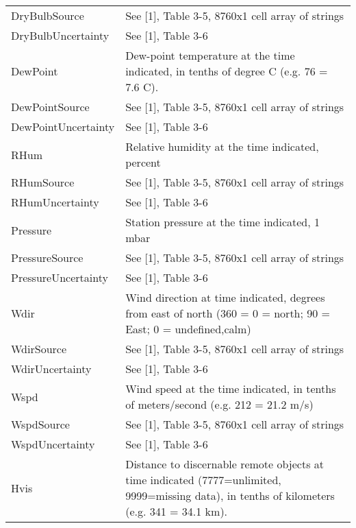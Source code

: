 \documentclass[letterpaper,10pt,english]{sphinxmanual}
\begin{document}
\begin{fulllineitems}
\begin{longtable}{|l|p{11cm}|}
DryBulbSource
 & 
See {[}1{]}, Table 3-5, 8760x1 cell array of strings
\\

DryBulbUncertainty
 & 
See {[}1{]}, Table 3-6
\\

DewPoint
 & 
Dew-point temperature at the time indicated, in tenths of degree C (e.g. 76 = 7.6 C).
\\

DewPointSource
 & 
See {[}1{]}, Table 3-5, 8760x1 cell array of strings
\\

DewPointUncertainty
 & 
See {[}1{]}, Table 3-6
\\

RHum
 & 
Relative humidity at the time indicated, percent
\\

RHumSource
 & 
See {[}1{]}, Table 3-5, 8760x1 cell array of strings
\\

RHumUncertainty
 & 
See {[}1{]}, Table 3-6
\\

Pressure
 & 
Station pressure at the time indicated, 1 mbar
\\

PressureSource
 & 
See {[}1{]}, Table 3-5, 8760x1 cell array of strings
\\

PressureUncertainty
 & 
See {[}1{]}, Table 3-6
\\

Wdir
 & 
Wind direction at time indicated, degrees from east of north (360 = 0 = north; 90 = East; 0 = undefined,calm)
\\

WdirSource
 & 
See {[}1{]}, Table 3-5, 8760x1 cell array of strings
\\

WdirUncertainty
 & 
See {[}1{]}, Table 3-6
\\

Wspd
 & 
Wind speed at the time indicated, in tenths of meters/second (e.g. 212 = 21.2 m/s)
\\

WspdSource
 & 
See {[}1{]}, Table 3-5, 8760x1 cell array of strings
\\

WspdUncertainty
 & 
See {[}1{]}, Table 3-6
\\

Hvis
 & 
Distance to discernable remote objects at time indicated (7777=unlimited, 9999=missing data), in tenths of kilometers (e.g. 341 = 34.1 km).
\\


\end{longtable}
\end{fulllineitems}
\end{document}
